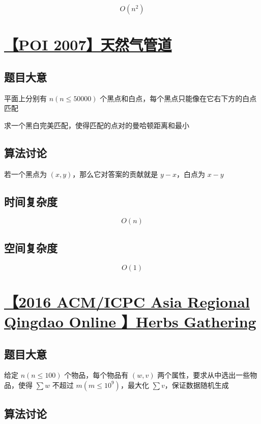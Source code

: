 \documentclass[UTF8]{article}
\begin{document}
$$
O(n^2)
$$

\section{\href{https://www.lydsy.com/JudgeOnline/problem.php?id=1108}{【POI 2007】天然气管道}}

\subsection{题目大意}

平面上分别有 $n(n \le 50000)$ 个黑点和白点，每个黑点只能像在它右下方的白点匹配

求一个黑白完美匹配，使得匹配的点对的曼哈顿距离和最小

\subsection{算法讨论}

若一个黑点为 $(x,y)$，那么它对答案的贡献就是 $y-x$，白点为 $x-y$

\subsection{时间复杂度}

$$
O(n)
$$

\subsection{空间复杂度}

$$
O(1)
$$

\section{\href{http://acm.hdu.edu.cn/showproblem.php?pid=5887}{【2016 ACM/ICPC Asia Regional Qingdao Online
】Herbs Gathering}}

\subsection{题目大意}

给定 $n(n \le 100)$ 个物品，每个物品有 $(w,v)$ 两个属性，要求从中选出一些物品，使得 $\sum w$ 不超过 $m(m \le 10^9)$，最大化 $\sum v$，保证数据随机生成

\subsection{算法讨论}
\end{document}
